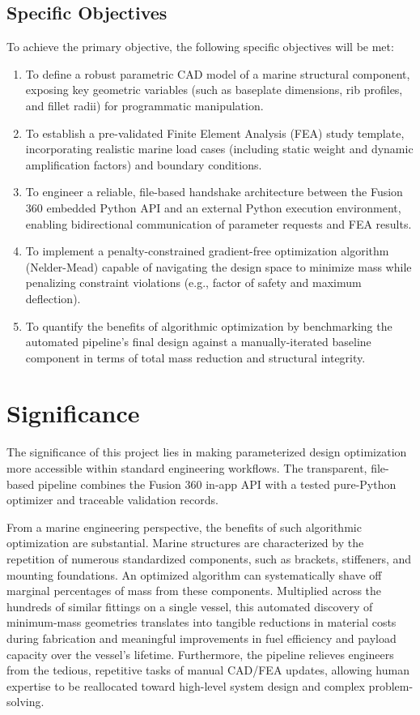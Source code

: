 \subsection{Specific Objectives}
To achieve the primary objective, the following specific objectives will be met:
\begin{enumerate}
    \item To define a robust parametric CAD model of a marine structural component, exposing key geometric variables (such as baseplate dimensions, rib profiles, and fillet radii) for programmatic manipulation.
    \item To establish a pre-validated Finite Element Analysis (FEA) study template, incorporating realistic marine load cases (including static weight and dynamic amplification factors) and boundary conditions.
    \item To engineer a reliable, file-based handshake architecture between the Fusion 360 embedded Python API and an external Python execution environment, enabling bidirectional communication of parameter requests and FEA results.
    \item To implement a penalty-constrained gradient-free optimization algorithm (Nelder-Mead) capable of navigating the design space to minimize mass while penalizing constraint violations (e.g., factor of safety and maximum deflection).
    \item To quantify the benefits of algorithmic optimization by benchmarking the automated pipeline's final design against a manually-iterated baseline component in terms of total mass reduction and structural integrity.
\end{enumerate}

\section{Significance}
The significance of this project lies in making parameterized design optimization more accessible within standard engineering workflows. The transparent, file-based pipeline combines the Fusion 360 in-app API with a tested pure-Python optimizer and traceable validation records.

From a marine engineering perspective, the benefits of such algorithmic optimization are substantial. Marine structures are characterized by the repetition of numerous standardized components, such as brackets, stiffeners, and mounting foundations. An optimized algorithm can systematically shave off marginal percentages of mass from these components. Multiplied across the hundreds of similar fittings on a single vessel, this automated discovery of minimum-mass geometries translates into tangible reductions in material costs during fabrication and meaningful improvements in fuel efficiency and payload capacity over the vessel's lifetime. Furthermore, the pipeline relieves engineers from the tedious, repetitive tasks of manual CAD/FEA updates, allowing human expertise to be reallocated toward high-level system design and complex problem-solving.

